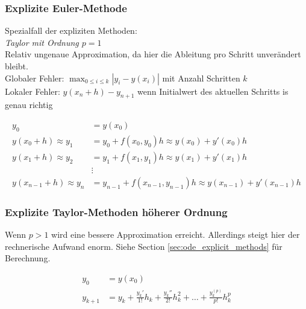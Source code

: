     
    \begin{minipage}{7cm}
      \subsubsection{Explizite Euler-Methode}
        Spezialfall der expliziten Methoden: \\
        \emph{Taylor mit Ordnung $p=1$} \\
        Relativ ungenaue Approximation,
        da hier die Ableitung pro Schritt unverändert bleibt.  \\
        
        Globaler Fehler: $\max_{0 \leq i \leq k} |y_i - y(x_i)|$ mit Anzahl Schritten $k$\\
        Lokaler Fehler: $y(x_n+h) - y_{n+1}$ wenn Initialwert des aktuellen Schritts is genau richtig
    \end{minipage}
    \hspace{8mm}
    \begin{minipage}{12cm}
        \begin{align*}
            y_0 &= y(x_0) \\
            y(x_0+h) \approx y_1 &= y_0 + f(x_0,y_0) h \approx y(x_0) + y'(x_0)h \\
            y(x_1+h) \approx y_2 &= y_1 + f(x_1,y_1)h \approx y(x_1) + y'(x_1)h \\
            & \vdots \\
            y(x_{n-1}+h) \approx y_n &= y_{n-1} + f(x_{n-1},y_{n-1})h \approx y(x_{n-1}) + y'(x_{n-1})h
        \end{align*}
    \end{minipage}
      
    \subsubsection{Explizite Taylor-Methoden höherer Ordnung}
      Wenn $p > 1$ wird eine bessere Approximation erreicht. Allerdings steigt hier der rechnerische
      Aufwand enorm. Siehe Section \ref{sec:ode_explicit_methods} für Berechnung.
      
      \begin{align*}
          y_0 &= y(x_0) \\
          y_{k+1} &= y_k + \frac{y_k'}{1!}h_k + \frac{y_k''}{2!} h_k^2 + \ldots + \frac{y_k^{(p)}}{p!} h_k^p
      \end{align*}
      
